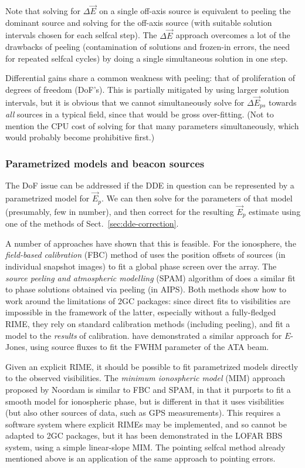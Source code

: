 \documentclass{aa}
\newcommand{\jones}[2]{\vec {#1}_{#2}}
\begin{document}
Note that solving for $\Delta\jones{E}{}$ on a single off-axis source is equivalent to peeling the dominant source and solving for the off-axis source (with suitable solution intervals chosen for each selfcal step). The $\Delta\jones{E}{}$ approach overcomes a lot of the drawbacks of peeling (contamination of solutions and frozen-in errors, the need for repeated selfcal cycles) by doing a single simultaneous solution in one step.

Differential gains share a common weakness with peeling: that of proliferation of degrees of freedom (DoF's). This is partially mitigated by using larger solution intervals, but it is obvious that we cannot simultaneously solve for $\Delta\jones{E}{ps}$ towards \emph{all} sources in a typical field, since that would be gross over-fitting. (Not to mention the CPU cost of solving for that many parameters simultaneously, which would probably become prohibitive first.) 

\subsubsection{Parametrized models and beacon sources}

The DoF issue can be addressed if the DDE in question can be represented by a parametrized model for $\jones{E}{p}$. We can then solve for the parameters of that model (presumably, few in number), and then correct for the resulting $\jones{E}{p}$ estimate using one of the methods of Sect.~\ref{sec:dde-correction}. 

A number of approaches have shown that this is feasible. For the ionosphere, the \emph{field-based calibration} (FBC) method of \citet{Cotton:FBC} uses the position offsets of sources (in individual snapshot images) to fit a global phase screen over the array. The \emph{source peeling and atmospheric modelling} (SPAM) algorithm of \citet{Intema:SPAM} does a similar fit to phase solutions obtained via peeling (in AIPS). Both methods show how to work around the limitations of 2GC packages: since direct fits to visibilities are impossible in the framework of the latter, especially without a fully-fledged RIME, they rely on standard calibration methods (including peeling), and fit a model to the \emph{results} of calibration. \citet{Hull:ata-beam-fitting} have demonstrated a similar approach for $E$-Jones, using source fluxes to fit the FWHM parameter of the ATA beam. 

Given an explicit RIME, it should be possible to fit parametrized models directly to the observed visibilities. The \emph{minimum ionospheric model} (MIM) approach proposed by Noordam is similar to FBC and SPAM, in that it purports to fit a smooth model for ionospheric phase, but is different in that it uses visibilities (but also other sources of data, such as GPS measurements). This requires a software system where explicit RIMEs may be implemented, and so cannot be adapted to 2GC packages, but it has been demonstrated in the LOFAR BBS system, using a simple linear-slope MIM. The pointing selfcal method \citep{SB:pointing} already mentioned above is an application of the same approach to pointing errors.
\end{document}
